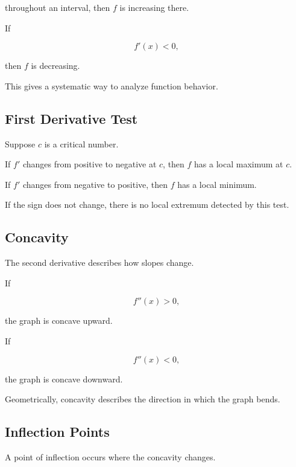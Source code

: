 throughout an interval, then \(f\) is increasing there.

If

\[ f'(x)<0, \]

then \(f\) is decreasing.

This gives a systematic way to analyze function behavior.

\subsection{First Derivative Test}
\label{subsec:first-derivative-test}

Suppose \(c\) is a critical number.

If \(f'\) changes from positive to negative at \(c\), then \(f\) has a local
maximum at \(c\).

If \(f'\) changes from negative to positive, then \(f\) has a local minimum.

If the sign does not change, there is no local extremum detected by this
test.

\subsection{Concavity}
\label{subsec:concavity}

The second derivative describes how slopes change.

If

\[ f''(x)>0, \]

the graph is concave upward.

If

\[ f''(x)<0, \]

the graph is concave downward.

Geometrically, concavity describes the direction in which the graph bends.

\subsection{Inflection Points}
\label{subsec:inflection-points}

A point of inflection occurs where the concavity changes.


